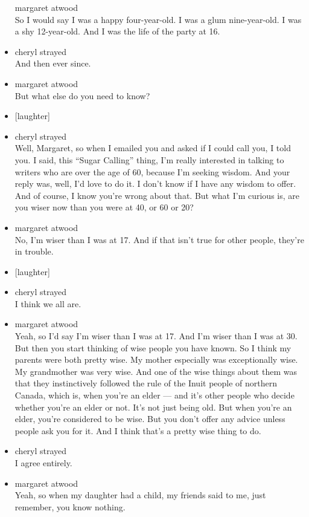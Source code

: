 \begin{itemize}
  margaret atwood\\
  So I would say I was a happy four-year-old. I was a glum
  nine-year-old. I was a shy 12-year-old. And I was the life of the
  party at 16.
\item
  cheryl strayed\\
  And then ever since.
\item
  margaret atwood\\
  But what else do you need to know?
\item
  {[}laughter{]}
\item
  cheryl strayed\\
  Well, Margaret, so when I emailed you and asked if I could call you, I
  told you. I said, this ``Sugar Calling'' thing, I'm really interested
  in talking to writers who are over the age of 60, because I'm seeking
  wisdom. And your reply was, well, I'd love to do it. I don't know if I
  have any wisdom to offer. And of course, I know you're wrong about
  that. But what I'm curious is, are you wiser now than you were at 40,
  or 60 or 20?
\item
  margaret atwood\\
  No, I'm wiser than I was at 17. And if that isn't true for other
  people, they're in trouble.
\item
  {[}laughter{]}
\item
  cheryl strayed\\
  I think we all are.
\item
  margaret atwood\\
  Yeah, so I'd say I'm wiser than I was at 17. And I'm wiser than I was
  at 30. But then you start thinking of wise people you have known. So I
  think my parents were both pretty wise. My mother especially was
  exceptionally wise. My grandmother was very wise. And one of the wise
  things about them was that they instinctively followed the rule of the
  Inuit people of northern Canada, which is, when you're an elder ---
  and it's other people who decide whether you're an elder or not. It's
  not just being old. But when you're an elder, you're considered to be
  wise. But you don't offer any advice unless people ask you for it. And
  I think that's a pretty wise thing to do.
\item
  cheryl strayed\\
  I agree entirely.
\item
  margaret atwood\\
  Yeah, so when my daughter had a child, my friends said to me, just
  remember, you know nothing.

\end{itemize}
